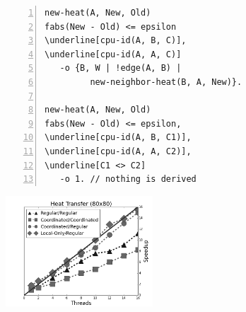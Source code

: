 \begin{topfig}
\scriptsize\begin{Verbatim}[numbers=left,commandchars=\\\[\]]
new-heat(A, New, Old)
fabs(New - Old) <= epsilon
\underline[cpu-id(A, B, C)],
\underline[cpu-id(A, A, C)]
   -o {B, W | !edge(A, B) |
         new-neighbor-heat(B, A, New)}.

new-heat(A, New, Old)
fabs(New - Old) <= epsilon,
\underline[cpu-id(A, B, C1)],
\underline[cpu-id(A, A, C2)],
\underline[C1 <> C2]
   -o 1. // nothing is derived
\end{Verbatim}
\end{topfig}
\normalsize

\begin{topfig}
   \begin{center}
      \includegraphics[width=5.5cm]{results/new-heat-transfer-80}
   \end{center}
\end{topfig}

